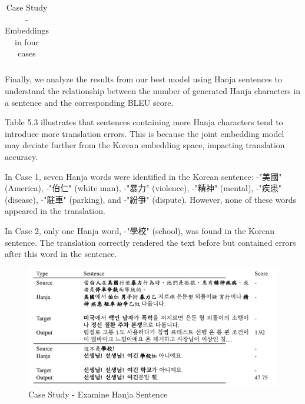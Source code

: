 \documentclass[PhD]{PHlab-thesis}
\begin{document}
\begin{table}
\begin{tabularx}{0.9\linewidth}{p{3cm} p{12cm} p{3cm}}
\bottomrule
\end{tabularx}
\caption{Case Study - Embeddings in four cases}
\label{tab:notation}
\end{table}

Finally, we analyze the results from our best model using Hanja sentences to understand the relationship between the number of generated Hanja characters in a sentence and the corresponding BLEU score.

Table 5.3 illustrates that sentences containing more Hanja characters tend to introduce more translation errors. This is because the joint embedding model may deviate further from the Korean embedding space, impacting translation accuracy.

In Case 1, seven Hanja words were identified in the Korean sentence: -"美國" (America), -"伯仁" (white man), -"暴力" (violence), -"精神" (mental), -"疾患" (disease), -"駐車" (parking), and -"紛爭" (dispute). However, none of these words appeared in the translation.

In Case 2, only one Hanja word, -"學校" (school), was found in the Korean sentence. The translation correctly rendered the text before  but contained errors after this word in the sentence.

\begin{figure}[h!]
  \centering
  \includegraphics[width=\linewidth]{tab_5_3.jpg}
  \captionsetup{type=table}
  \caption{Case Study - Examine Hanja Sentence}
  \label{tab:Case Study - Examine Hanja Sentence}
\end{figure}
\end{document}
